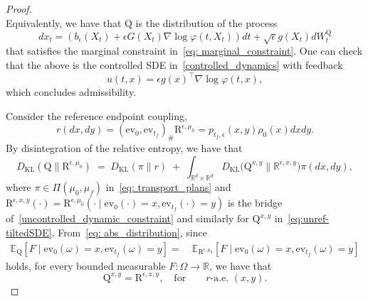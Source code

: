 \documentclass{amsart}
\numberwithin{equation}{section}
\newcommand{\R}{\mathbb{R}}
\newcommand{\E}{\mathbb{E}}
\newcommand{\KL}{D_{\mathrm{KL}}}
\begin{document}
\begin{proof}
\[\]
Equivalently, we have that $\mathrm{Q}$ is the distribution of the process
\begin{equation}\label{eq:unref-tiltedSDE}
d x_t=(b_{\epsilon}(X_t)+\epsilon  G(X_t)  \nabla\log\varphi(t, X_t)) dt+\sqrt{\epsilon}  g(X_t)  dW_t^{\mathrm{Q}}
\end{equation}
that satisfies the marginal constraint in~\eqref{eq: marginal_constraint}.
One can check that the above is the controlled SDE in~\eqref{controlled_dynamics} with feedback
\begin{equation}\label{eq: admissible control}
u(t,x)=\epsilon  g(x)^\top\nabla\log\varphi(t,x),
\end{equation}
which concludes admissibility.

Consider the reference endpoint coupling,
\[
r(dx,dy)=(\mathrm{ev}_0,\mathrm{ev}_{t_f})_{\#}\mathrm{R}^{\epsilon,\mu_0}=p_{t_f,\epsilon}(x,y)\rho_0(x)dxdy.%
\]
By disintegration of the relative entropy, we have that 
\begin{equation}\label{eq:KL-disintegration}
\KL(\mathrm{Q} \| \mathrm{R}^{\epsilon,\mu_0})
\;=\;
\KL(\pi \| r)
\;+\;
\int_{\R^d\times\R^d}
\KL\!\big(\mathrm{Q}^{x,y} \| \R^{\epsilon,x,y}\big) \pi(dx,dy),
\end{equation}
where $\pi\in \Pi(\mu_0,\mu_f)$ in~\eqref{eq: transport_plans} and $\mathrm{R}^{\epsilon,x,y}( \cdot )=\mathrm{R}^{\epsilon,\mu_0}( \cdot \mid \mathrm{ev}_0(\cdot)=x,\mathrm{ev}_{t_f}(\cdot)=y)$ is the bridge of~\eqref{uncontrolled_dynamic_constraint} and similarly for $\mathrm{Q}^{x,y}$ in~\eqref{eq:unref-tiltedSDE}. From~\eqref{eq: abs_distribution}, since 
\begin{align*}
\E_\mathrm{Q}[F\mid \mathrm{ev}_0(\omega)=x,\mathrm{ev}_{t_f}(\omega)=y]%
=& ~\E_{\mathrm{R}^{\epsilon,\mu_0}}[F\mid \mathrm{ev}_0(\omega)=x,\mathrm{ev}_{t_f}(\omega)=y]
\end{align*}
holds, for every bounded measurable \(F:\Omega\to\R\),  we have that 
\[
\mathrm{Q}^{x,y} = \mathrm{R}^{\epsilon,x,y}, \quad\text{for}\qquad r\text{-a.e. }(x,y).
\]
\end{proof}
\end{document}
